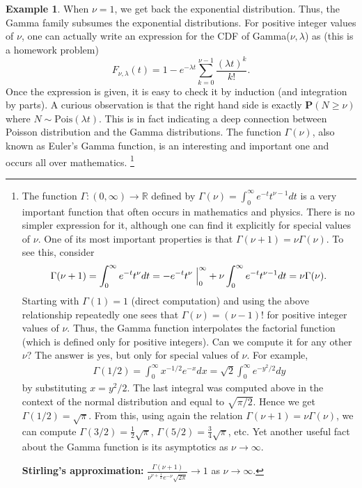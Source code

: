 \documentclass[preprint,  11pt]{amsart}
\theoremstyle{plain} %
\theoremstyle{definition} %
\newtheorem{example}[theorem]{Example}
\begin{document}
\begin{example}
When $\nu=1$, we get back the exponential distribution. Thus, the Gamma family subsumes the exponential distributions.   For positive integer values of $\nu$, one can actually write an expression for the CDF of Gamma($\nu,\lambda$)  as (this is a homework problem)
$$
F_{\nu,\lambda}(t)=1-e^{-\lambda t}\sum\limits_{k=0}^{\nu-1}\frac{(\lambda t)^{k}}{k!}.
$$
Once the expression is given, it is easy to check it by induction (and integration by parts). A curious observation is that the right hand side is exactly $\mathbf{P}(N\ge \nu)$ where $N\sim \mbox{Pois}(\lambda t)$. This is in fact indicating a deep connection between Poisson distribution and the Gamma distributions. The function $\Gamma(\nu)$, also known as Euler's Gamma function, is an interesting and important  one and occurs all over mathematics.
\footnote{ The function $\Gamma:(0,\infty)\rightarrow \mathbb{R}$ defined by $\Gamma(\nu)=\int_{0}^{\infty}e^{-t}t^{\nu-1}dt$ is a very important function that often occurs in mathematics and physics. There is no simpler expression for it, although one can find it explicitly for special values of $\nu$. One of its most important properties is that $\Gamma(\nu+1)=\nu\Gamma(\nu)$. To see this, consider
$$
\Gamma(\nu+1)=\int_{0}^{\infty}e^{-t}t^{\nu}dt = -e^{-t}t^{\nu}\left.\vphantom{\hbox{\Large (}}\right|_{0}^{\infty}+\nu\int_{0}^{\infty}e^{-t}t^{\nu-1}dt = \nu \Gamma(\nu).
$$
Starting with  $\Gamma(1)=1$ (direct computation) and using the above relationship repeatedly one sees that $\Gamma(\nu)=(\nu-1)!$ for positive integer values of $\nu$. Thus, the Gamma function interpolates the factorial function (which is defined only for positive integers).  Can we compute it for any other $\nu$? The answer is yes, but only for special values of $\nu$. For example, 
\[\begin{aligned}
\Gamma(1/2)= \int_{0}^{\infty}x^{-1/2}e^{-x}dx = \sqrt{2}\int_{0}^{\infty}e^{-y^{2}/2}dy
\end{aligned}\]
by substituting $x=y^{2}/2$. The last integral was computed above in the context of the normal distribution and equal to $\sqrt{\pi/2}$. Hence we get $\Gamma(1/2)=\sqrt{\pi}$. From this, using again the relation $\Gamma(\nu+1)=\nu\Gamma(\nu)$, we can compute $\Gamma(3/2)=\frac{1}{2}\sqrt{\pi}$, $\Gamma(5/2)=\frac{3}{4}\sqrt{\pi}$, etc. Yet another useful fact about the Gamma function is its asymptotics as $\nu\rightarrow\infty$.

{\bf Stirling's approximation:} $\frac{\Gamma(\nu+1)}{\nu^{\nu+\frac{1}{2}}e^{-\nu}\sqrt{2\pi}}\rightarrow 1$ as $\nu\rightarrow \infty$.

}
\end{example}
\end{document}
